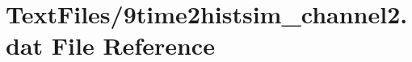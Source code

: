 \hypertarget{9time2histsim__channel2_8dat}{}\section{Text\+Files/9time2histsim\+\_\+channel2.dat File Reference}
\label{9time2histsim__channel2_8dat}
